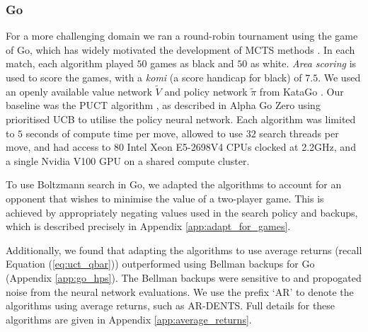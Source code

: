     
    
    \subsubsection{Go} \label{sec:go}
        For a more challenging domain we ran a round-robin tournament using the game of Go, which has widely motivated the development of MCTS methods %
        . 
        In each match, each algorithm played $50$ games as black and $50$ as white. \textit{Area scoring} is used to score the games, with a \textit{komi} (a score handicap for black) 
        of $7.5$. 
        We used an openly available value network $\tilde{V}$ and policy network $\tilde{\pi}$ from KataGo %
        . Our baseline was the PUCT algorithm %
        , as described in Alpha Go Zero %
         using prioritised UCB %
          to utilise the policy neural network. Each algorithm was limited to $5$ seconds of compute time per move, allowed to use $32$ search threads per move, and had access to 80 Intel Xeon E5-2698V4 CPUs clocked at 2.2GHz, and a single Nvidia V100 GPU on a shared compute cluster.
        
        To use Boltzmann search in Go, we adapted the algorithms to account for an opponent that wishes to minimise the value of a two-player game. This is achieved by appropriately negating values used in the search policy and backups, which is described precisely in Appendix \ref{app:adapt_for_games}. 
        
        Additionally, we found that adapting the algorithms to use average returns (recall Equation (\ref{eq:uct_qbar})) outperformed using Bellman backups for Go (Appendix \ref{app:go_hps}). The Bellman backups were sensitive to and propogated noise from the neural network evaluations. We use the prefix `AR' to denote the algorithms using average returns, such as AR-DENTS. Full details for these algorithms are given in Appendix \ref{app:average_returns}.
        
